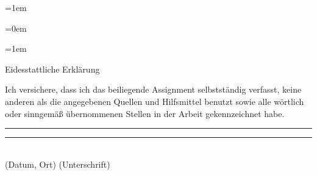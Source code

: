 \documentclass[a4paper,12pt]{article}
\newif\iflistoffigures
\newif\iflistoftables
\newif\ifacronym
\begin{document}
	
\parskip=1em
\parindent=0cm



\normalsize

\begin{spacing}{1.0} %
\parskip=0em
\newpage

\setcounter{tocdepth}{2}
\tableofcontents 
\newpage

\iflistoffigures
\listoffigures 
\newpage
\fi

\iflistoftables
\listoftables 
\newpage
\fi

\ifacronym

\fi

\parskip=1em
\end{spacing} 

\clearpage

\setcounter{romanPagenumber}{\value{page}} %


\pagestyle{fancy}
\fancyhead{}
\fancyhead[LO,RE]{\textsc{\Titel}}
\fancyhead[RO,LE]{\thepage}
\fancyfoot[CO,CE]{}
\setlength{\headheight}{15pt}



\begin{spacing}{1.5} %







\end{spacing}

\clearpage

\pagestyle{plain}
\setcounter{page}{\theromanPagenumber}
\renewcommand{\refname}{Literatur-- und Quellenverzeichnis}
%


\onehalfspacing
\clearpage

\printindex
\clearpage

\pagestyle{empty} 
\thispagestyle{empty}

\begin{center}
{\Large Eidesstattliche Erklärung}
\vspace*{4cm}\end{center}
\noindent
Ich versichere, dass ich das beiliegende Assignment selbstständig verfasst, keine anderen als die angegebenen Quellen und Hilfsmittel benutzt sowie alle wörtlich oder sinngemäß übernommenen Stellen in der Arbeit gekennzeichnet habe. 
\vspace{3cm}

\hspace{-0.8cm}
\rule[0.5ex]{6.5cm}{1pt}
\hspace{1.3cm}
\rule[0.5ex]{6.5cm}{1pt}
\\(Datum, Ort)
\hspace{6.3cm}
(Unterschrift)

\clearpage
\end{document}
